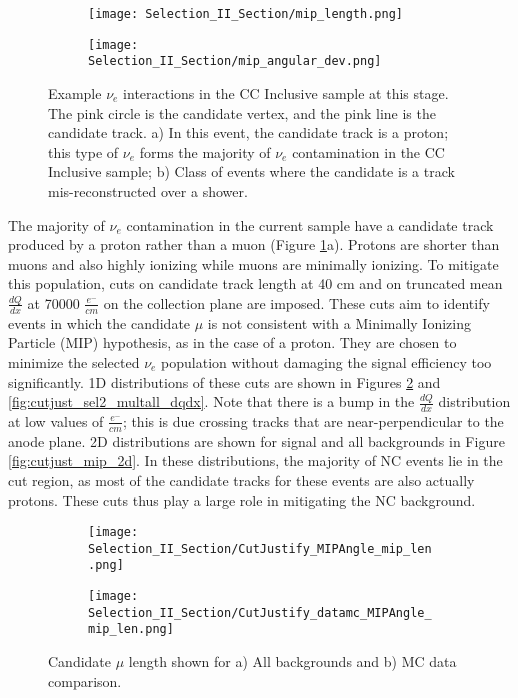 \begin{figure}[H]
  \begin{subfigure}[t]{0.55\textwidth}
	  \centering
\texttt{[image: Selection\_II\_Section/mip\_length.png]}
    \caption{ }
  \end{subfigure} 
  \begin{subfigure}[t]{0.4\textwidth}
	  \centering
\texttt{[image: Selection\_II\_Section/mip\_angular\_dev.png]}
    \caption{ }
  \end{subfigure} 
\caption{ Example $\nu_e$ interactions in the CC Inclusive sample at this stage.  The pink circle is the candidate vertex, and the pink line is the candidate track. a) In this event, the candidate track is a proton; this type of $\nu_e$ forms the majority of $\nu_e$ contamination in the CC Inclusive sample; b) Class of events where the candidate is a track mis-reconstructed over a shower. }
\label{fig:mip_ex_len_angular}
\end{figure}


\par The majority of $\nu_e$ contamination in the current sample have a candidate track produced by a proton rather than a muon (Figure \ref{fig:mip_ex_len_angular}a). Protons are shorter than muons and also highly ionizing while muons are minimally ionizing. To mitigate this population, cuts on candidate track length at 40 cm and on truncated mean $\frac{dQ}{dx}$ at 70000 $\frac{e^-}{cm}$ on the collection plane are imposed.  These cuts aim to identify events in which the candidate $\mu$ is not consistent with a Minimally Ionizing Particle (MIP) hypothesis, as in the case of a proton.  They are chosen to minimize the selected $\nu_e$ population without damaging the signal efficiency too significantly.  1D distributions of these cuts are shown in Figures \ref{fig:cutjust_sel2_multall_len} and \ref{fig:cutjust_sel2_multall_dqdx}. Note that there is a bump in the $\frac{dQ}{dx}$ distribution at low values of $\frac{e^-}{cm}$; this is due crossing tracks that are near-perpendicular to the anode plane.  2D distributions are shown for signal and all backgrounds in Figure \ref{fig:cutjust_mip_2d}.  In these distributions, the majority of NC events lie in the cut region, as most of the candidate tracks for these events are also actually protons. These cuts thus play a large role in mitigating the NC background.

\begin{figure}[h!]
  \begin{subfigure}[t]{0.35\textwidth}
\texttt{[image: Selection\_II\_Section/CutJustify\_MIPAngle\_mip\_len.png]}
    \caption{ }
  \end{subfigure} 
  \hspace{20mm}
  \begin{subfigure}[t]{0.35\textwidth}
\texttt{[image: Selection\_II\_Section/CutJustify\_datamc\_MIPAngle\_mip\_len.png]}
    \caption{ }
  \end{subfigure} 

\caption{ Candidate $\mu$ length shown for a) All backgrounds and b) MC data comparison. }
\label{fig:cutjust_sel2_multall_len}
\end{figure}


